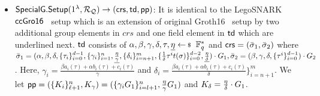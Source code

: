 \begin{itemize}
\item ${\mathsf{SpecialG}}.{\mathsf{Setup}}(1^{\lambda}, \mathcal{R}_{\mathcal{Q}}) \rightarrow (\mathsf{crs}, \mathsf{td},\mathsf{pp})$:  It is identical to the LegoSNARK  ${\mathsf{ccGro16}}$~\cite[Fig.~22]{LegoSNARK} setup which  is  an extension of original Groth16~\cite{Groth16} setup by two additional group elements in $ crs $ and one field element in $ \mathsf{td}$ which are underlined next. $\mathsf{td} $ consists of $ \alpha, \beta, \gamma, \delta, \tau, \underline{\eta} \leftsample \F_q^*$ and $\mathsf{crs} = (\bar{\sigma}_1, \bar{\sigma}_2)$ where 
$ \bar{\sigma}_1 = (\alpha  , \beta  , \delta  , \{\tau_i  \}_{i=0}^{d-1}, \{\gamma_i\}_{i=1}^n, \underline{\frac{\eta}{\gamma}}, \{\delta_i\}_{i=n+1}^m, \{\frac{1}{\delta}\tau^it(\sigma) \}_{i=0}^{d-2}, \underline{\frac{\eta}{\delta}})\cdot {G}_1,
\bar{\sigma}_2 = (\beta  , \gamma  , \delta  , \{\tau^i  \}_{i=0}^{d-1})\cdot {G}_2 $. Here, $ \gamma_i = \frac{\beta a_i(\tau)+ \alpha b_i(\tau)+ c_i(\tau)}{\gamma} $ and $ \delta_i =\frac{\beta a_i(\tau)+ \alpha b_i(\tau)+ c_i(\tau)}{\delta} \}_{i=n+1}^m  $.
We let $\mathsf{pp} = (\{K_i\}_{\ell+1}^n,K_\gamma) = (\{\gamma_i{G}_1\}_{i=l+1}^{n},   \frac{\eta}{\gamma}{G}_1 )$ and $K_{\delta} = \frac{\eta}{\delta} \cdot {G}_1$.


\end{itemize}
